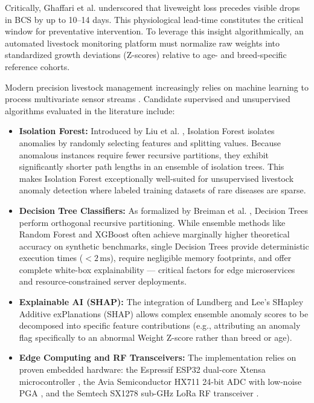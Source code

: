 \documentclass[11pt,a4paper]{report}
\begin{document}
Critically, Ghaffari et al. \cite{ghaffari2023invited} underscored that liveweight loss precedes visible drops in BCS by up to 10--14 days. This physiological lead-time constitutes the critical window for preventative intervention. To leverage this insight algorithmically, an automated livestock monitoring platform must normalize raw weights into standardized growth deviations (Z-scores) relative to age- and breed-specific reference cohorts.

Modern precision livestock management increasingly relies on machine learning to process multivariate sensor streams \cite{lundbeck2022machine}. Candidate supervised and unsupervised algorithms evaluated in the literature include:
\begin{itemize}
    \item \textbf{Isolation Forest:} Introduced by Liu et al. \cite{liu2008isolation}, Isolation Forest isolates anomalies by randomly selecting features and splitting values. Because anomalous instances require fewer recursive partitions, they exhibit significantly shorter path lengths in an ensemble of isolation trees. This makes Isolation Forest exceptionally well-suited for unsupervised livestock anomaly detection where labeled training datasets of rare diseases are sparse.
    \item \textbf{Decision Tree Classifiers:} As formalized by Breiman et al. \cite{breiman1984classification}, Decision Trees perform orthogonal recursive partitioning. While ensemble methods like Random Forest and XGBoost often achieve marginally higher theoretical accuracy on synthetic benchmarks, single Decision Trees provide deterministic execution times ($< 2\,\text{ms}$), require negligible memory footprints, and offer complete white-box explainability --- critical factors for edge microservices and resource-constrained server deployments.
    \item \textbf{Explainable AI (SHAP):} The integration of Lundberg and Lee's SHapley Additive exPlanations (SHAP) \cite{lundberg2017unified} allows complex ensemble anomaly scores to be decomposed into specific feature contributions (e.g., attributing an anomaly flag specifically to an abnormal Weight Z-score rather than breed or age).
    \item \textbf{Edge Computing and RF Transceivers:} The implementation relies on proven embedded hardware: the Espressif ESP32 dual-core Xtensa microcontroller \cite{espressif2023esp32}, the Avia Semiconductor HX711 24-bit ADC with low-noise PGA \cite{avia2014hx711}, and the Semtech SX1278 sub-GHz LoRa RF transceiver \cite{semtech2020sx1278}.
\end{itemize}
\end{document}
